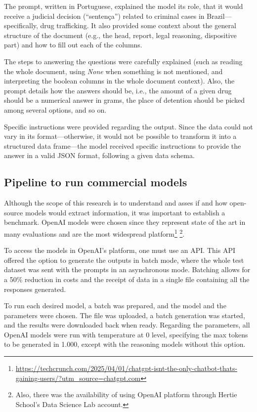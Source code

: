 \documentclass[
  12pt,
]{article}
\begin{document}
The prompt, written in Portuguese, explained the model its role, that it
would receive a judicial decision (``sentença'') related to criminal
cases in Brazil---specifically, drug trafficking. It also provided some
context about the general structure of the document (e.g., the head,
report, legal reasoning, dispositive part) and how to fill out each of
the columns.

The steps to answering the questions were carefully explained (such as
reading the whole document, using \emph{None} when something is not
mentioned, and interpreting the boolean columns in the whole document
context). Also, the prompt details how the answers should be, i.e., the
amount of a given drug should be a numerical answer in grams, the place
of detention should be picked among several options, and so on.

Specific instructions were provided regarding the output. Since the data
could not vary in its format---otherwise, it would not be possible to
transform it into a structured data frame---the model received specific
instructions to provide the answer in a valid JSON format, following a
given data schema.

\subsection{Pipeline to run commercial
models}\label{pipeline-to-run-commercial-models}

Although the scope of this research is to understand and asses if and
how open-source models would extract information, it was important to
establish a benchmark. OpenAI models were chosen since they represent
state of the art in many evaluations and are the most widespread
platform\footnote{\url{https://techcrunch.com/2025/04/01/chatgpt-isnt-the-only-chatbot-thats-gaining-users/?utm_source=chatgpt.com}}
\footnote{Also, there was the availability of using OpenAI platform
  through Hertie School's Data Science Lab account.}.

To access the models in OpenAI's platform, one must use an API. This API
offered the option to generate the outputs in batch mode, where the
whole test dataset was sent with the prompts in an asynchronous mode.
Batching allows for a 50\% reduction in costs and the receipt of data in
a single file containing all the responses generated.

To run each desired model, a batch was prepared, and the model and the
parameters were chosen. The file was uploaded, a batch generation was
started, and the results were downloaded back when ready. Regarding the
parameters, all OpenAI models were run with temperature at 0 level,
specifying the max tokens to be generated in 1.000, except with the
reasoning models without this option.
\end{document}
